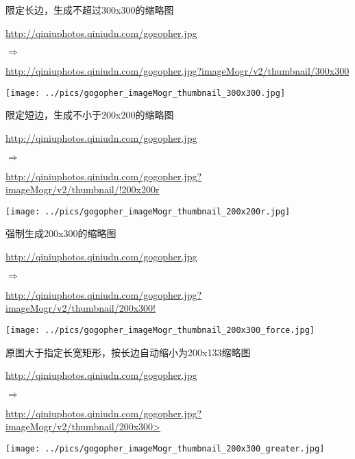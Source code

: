 \documentclass[11pt, oneside]{book}
\newcommand{\qpar}[1]{
\vspace{0.25em}
\noindent
#1\par
\vspace{0.25em}
}
\newcommand{\qurl}[1]{\url{#1}}
\begin{document}
\begin{CJK*}{UTF8}{song}
\begin{sample}
  \caption{限定长边，生成不超过300x300的缩略图}
    \qpar{\qurl{http://qiniuphotos.qiniudn.com/gogopher.jpg}}
    \qpar{$\Rightarrow$}
    \qpar{\qurl{http://qiniuphotos.qiniudn.com/gogopher.jpg?imageMogr/v2/thumbnail/300x300}}

    \begin{center}
      \texttt{[image: ../pics/gogopher\_imageMogr\_thumbnail\_300x300.jpg]}
    \end{center}
  \label{imageMogr-thumbnail-300x300}
\end{sample}

\begin{sample}
  \caption{限定短边，生成不小于200x200的缩略图}
    \qpar{\qurl{http://qiniuphotos.qiniudn.com/gogopher.jpg}}
    \qpar{$\Rightarrow$}
    \qpar{\qurl{http://qiniuphotos.qiniudn.com/gogopher.jpg?imageMogr/v2/thumbnail/!200x200r}}

    \begin{center}
      \texttt{[image: ../pics/gogopher\_imageMogr\_thumbnail\_200x200r.jpg]}
    \end{center}
  \label{imageMogr-thumbnail-200x200r}
\end{sample}

\begin{sample}
  \caption{强制生成200x300的缩略图}
    \qpar{\qurl{http://qiniuphotos.qiniudn.com/gogopher.jpg}}
    \qpar{$\Rightarrow$}
    \qpar{\qurl{http://qiniuphotos.qiniudn.com/gogopher.jpg?imageMogr/v2/thumbnail/200x300!}}

    \begin{center}
      \texttt{[image: ../pics/gogopher\_imageMogr\_thumbnail\_200x300\_force.jpg]}
    \end{center}
  \label{imageMogr-thumbnail-200x300-force}
\end{sample}

\begin{sample}
  \caption{原图大于指定长宽矩形，按长边自动缩小为200x133缩略图}
    \qpar{\qurl{http://qiniuphotos.qiniudn.com/gogopher.jpg}}
    \qpar{$\Rightarrow$}
    \qpar{\qurl{http://qiniuphotos.qiniudn.com/gogopher.jpg?imageMogr/v2/thumbnail/200x300>}}

    \begin{center}
      \texttt{[image: ../pics/gogopher\_imageMogr\_thumbnail\_200x300\_greater.jpg]}
    \end{center}
  \label{imageMogr-thumbnail-200x300-greater}
\end{sample}


\end{CJK*}
\end{document}
